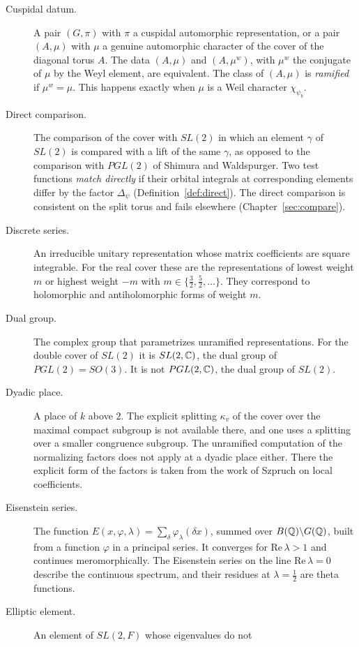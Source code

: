\begin{description}
\item[Cuspidal datum.] A pair $(G,\pi)$ with $\pi$ a cuspidal
  automorphic representation, or a pair $(A,\mu)$ with $\mu$ a genuine
  automorphic character of the cover of the diagonal torus $A$. The data
  $(A,\mu)$ and $(A,\mu^w)$, with $\mu^w$ the conjugate of $\mu$ by the
  Weyl element, are equivalent. The class of $(A,\mu)$ is \emph{ramified}
  if $\mu^w=\mu$. This happens exactly when $\mu$ is a Weil character
  $\chi_{\psi_b}$.
\item[Direct comparison.] The comparison of the cover with $SL(2)$ in
  which an element $\gamma$ of $SL(2)$ is compared with a lift of the same
  $\gamma$, as opposed to the comparison with $PGL(2)$ of Shimura and
  Waldspurger. Two test functions \emph{match directly} if their orbital
  integrals at corresponding elements differ by the factor $\Delta_\psi$
  (Definition~\ref{def:direct}). The direct comparison is consistent on
  the split torus and fails elsewhere (Chapter~\ref{sec:compare}).
\item[Discrete series.] An irreducible unitary representation whose
  matrix coefficients are square integrable. For the real cover these are
  the representations of lowest weight $m$ or highest weight $-m$ with
  $m\in\{\frac32,\frac52,\dots\}$. They correspond to holomorphic and
  antiholomorphic forms of weight $m$.
\item[Dual group.] The complex group that parametrizes unramified
  representations. For the double cover of $SL(2)$ it is $SL(2,\mathbb{C})$, the
  dual group of $PGL(2)=SO(3)$. It is not $PGL(2,\mathbb{C})$, the dual group of
  $SL(2)$.
\item[Dyadic place.] A place of $k$ above $2$. The explicit splitting
  $\kappa_v$ of the cover over the maximal compact subgroup is not
  available there, and one uses a splitting over a smaller congruence
  subgroup. The unramified computation of the normalizing factors does
  not apply at a dyadic place either. There the explicit form of the
  factors is taken from the work of Szpruch on local coefficients.
\item[Eisenstein series.] The function $E(x,\varphi,\lambda)=\sum_\delta
  \varphi_\lambda(\delta x)$, summed over $B(\mathbb{Q})\backslash G(\mathbb{Q})$, built
  from a function $\varphi$ in a principal series. It converges for
  $\mathrm{Re}\,\lambda>1$ and continues meromorphically. The Eisenstein
  series on the line $\mathrm{Re}\,\lambda=0$ describe the continuous
  spectrum, and their residues at $\lambda=\frac12$ are theta functions.
\item[Elliptic element.] An element of $SL(2,F)$ whose eigenvalues do not

\end{description}
